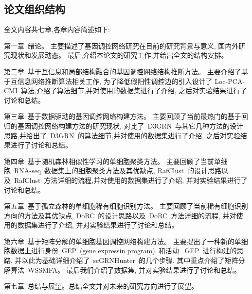 \subsection{论文组织结构}

全文内容共七章,各章内容简述如下:

第一章~绪论。
主要描述了基因调控网络研究在目前的研究背景与意义, 国内外研究现状和发展动态。
最后,介绍本论文的研究工作,并给出全文的结构安排。

第二章~基于互信息和局部结构融合的基因调控网络结构推断方法。
主要介绍了基于互信息网络推断算法相关工作, 为了降低假阳性调控边的引入设计了
Loc-PCA-CMI~算法,介绍了算法细节,并对使用的数据集进行了介绍, 之后对实验结果进行了讨论和总结。

第三章~基于数据驱动的基因调控网络构建方法。
主要回顾了当前最热门的基于回归的基因调控网络构建方法的研究现状,
对比了~D3GRN~与其它几种方法的设计思路,并给出了~D3GRN~的算法细节,并对使用的数据集进行了介绍, 之后对实验结果进行了讨论和总结。

第四章~基于随机森林相似性学习的单细胞聚类方法。
主要回顾了当前单细胞~RNA-seq~数据集上的细胞聚类方法及其优缺点, 
RafClust~的设计思路以及~RafClust~方法详细的流程,并对使用的数据集进行了介绍, 并对实验结果进行了讨论和总结。

第五章~基于孤立森林的单细胞稀有细胞识别方法。
主要回顾了当前稀有细胞识别方向的方法及其优缺点, 
DoRC~的设计思路以及~DoRC~方法详细的流程, 并对使用的数据集进行了介绍, 并对实验结果进行了讨论和总结。

第六章~基于矩阵分解的单细胞基因调控网络构建方法。
主要提出了一种新的单细胞数据上进行身份~GEP~(gene expressin program)~和活动~
GEP~进行构建的思路, 并以此为基础详细介绍了~scGRNHunter~的几个步骤, 其中重点介绍了矩阵分解算法~WSSMFA。
最后我们介绍了数据集, 并对实验结果进行了讨论和总结。

第七章~总结与展望。总结全文并对未来的研究方向进行了展望。